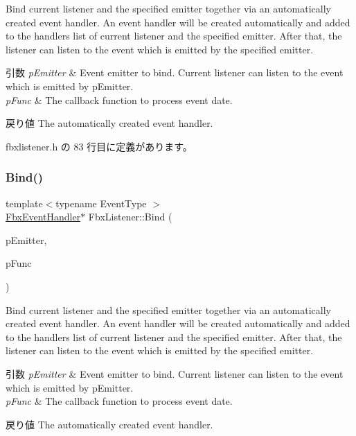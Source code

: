 Bind current listener and the specified emitter together via an automatically created event handler. An event handler will be created automatically and added to the handlers list of current listener and the specified emitter. After that, the listener can listen to the event which is emitted by the specified emitter. 
\begin{DoxyParams}{引数}
{\em p\+Emitter} & Event emitter to bind. Current listener can listen to the event which is emitted by p\+Emitter. \\
\hline
{\em p\+Func} & The callback function to process event date. \\
\hline
\end{DoxyParams}
\begin{DoxyReturn}{戻り値}
The automatically created event handler. 
\end{DoxyReturn}


 fbxlistener.\+h の 83 行目に定義があります。

\mbox{\label{class_fbx_listener_aeb47fdd2b68d0d626e3b59ee2da20255}} 
\subsubsection{\texorpdfstring{Bind()}{Bind()}\hspace{0.1cm}{\footnotesize\ttfamily [3/3]}}
{\footnotesize\ttfamily template$<$typename Event\+Type $>$ \\
\hyperlink{class_fbx_event_handler}{Fbx\+Event\+Handler}$\ast$ Fbx\+Listener\+::\+Bind (\begin{DoxyParamCaption}\item[{\hyperlink{class_fbx_emitter}{Fbx\+Emitter} \&}]{p\+Emitter,  }\item[{void($\ast$)(const Event\+Type $\ast$, \hyperlink{class_fbx_listener}{Fbx\+Listener} $\ast$)}]{p\+Func }\end{DoxyParamCaption})\hspace{0.3cm}{\ttfamily [inline]}}

Bind current listener and the specified emitter together via an automatically created event handler. An event handler will be created automatically and added to the handlers list of current listener and the specified emitter. After that, the listener can listen to the event which is emitted by the specified emitter. 
\begin{DoxyParams}{引数}
{\em p\+Emitter} & Event emitter to bind. Current listener can listen to the event which is emitted by p\+Emitter. \\
\hline
{\em p\+Func} & The callback function to process event date. \\
\hline
\end{DoxyParams}
\begin{DoxyReturn}{戻り値}
The automatically created event handler. 
\end{DoxyReturn}


